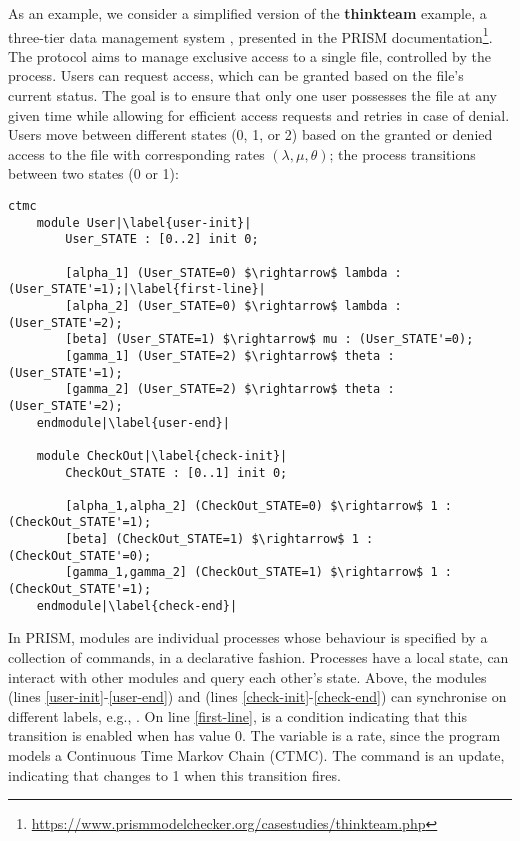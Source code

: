 As an example, we consider a simplified version of the
\textbf{thinkteam} example, a three-tier data management system
\cite{DBLP:journals/entcs/BeekMLGFS05}, presented in the PRISM
documentation\footnote{\url{https://www.prismmodelchecker.org/casestudies/thinkteam.php}}.
{The protocol aims to manage exclusive access to a single file,
  controlled by the  process. Users can request
  access, which can be granted based on the file's current status. The
  goal is to ensure that only one user possesses the file at any given
  time while allowing for efficient access requests and retries in
  case of denial.}  Users move between different states (0, 1, or 2)
based on the granted or denied access to the file with corresponding
rates $(\lambda, \mu, \theta)$; the  process
transitions between two states (0 or 1):
%
\begin{lstlisting}[style=prism-color,% caption={A PRISM example},captionpos=b,
  frame=none,label={example1},escapechar=|]
	ctmc 
	module User|\label{user-init}|
		User_STATE : [0..2] init 0;
	
		[alpha_1] (User_STATE=0) $\rightarrow$ lambda : (User_STATE'=1);|\label{first-line}|
		[alpha_2] (User_STATE=0) $\rightarrow$ lambda : (User_STATE'=2);
		[beta] (User_STATE=1) $\rightarrow$ mu : (User_STATE'=0);
		[gamma_1] (User_STATE=2) $\rightarrow$ theta : (User_STATE'=1);
		[gamma_2] (User_STATE=2) $\rightarrow$ theta : (User_STATE'=2);
	endmodule|\label{user-end}|
	
	module CheckOut|\label{check-init}|
		CheckOut_STATE : [0..1] init 0;
	
		[alpha_1,alpha_2] (CheckOut_STATE=0) $\rightarrow$ 1 : (CheckOut_STATE'=1);
		[beta] (CheckOut_STATE=1) $\rightarrow$ 1 : (CheckOut_STATE'=0);
		[gamma_1,gamma_2] (CheckOut_STATE=1) $\rightarrow$ 1 : (CheckOut_STATE'=1);
	endmodule|\label{check-end}|
\end{lstlisting}
%
In PRISM, modules are individual processes whose behaviour is
specified by a collection of commands, in a declarative fashion.
Processes have a local state, can interact with other modules and
query each other's state. Above, the modules  (lines
\ref{user-init}-\ref{user-end}) and  (lines
\ref{check-init}-\ref{check-end}) can synchronise on different labels, e.g., 
. %
On line \ref{first-line},  is a condition
indicating that this transition is enabled when 
has value 0. The variable  is a rate, since the
program models a Continuous Time Markov Chain (CTMC). The command
 is an update, indicating that
 changes to 1 when this transition fires.

